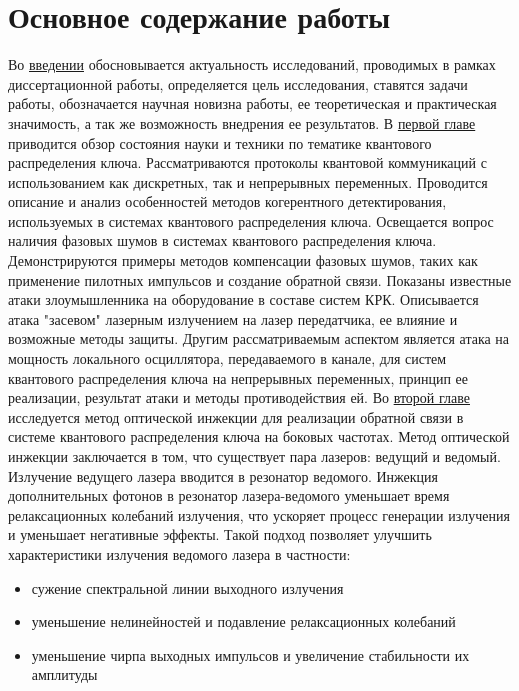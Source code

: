 \section*{Основное содержание работы }
Во \underline{введении} обосновывается актуальность исследований, проводимых в рамках диссертационной работы, определяется цель исследования, ставятся задачи работы, обозначается научная новизна работы, ее теоретическая и практическая значимость, а так же возможность внедрения ее результатов. 
\newline В \underline{первой главе} приводится обзор состояния науки и техники по тематике квантового распределения ключа. Рассматриваются протоколы квантовой коммуникаций с использованием как дискретных, так и непрерывных переменных. Проводится описание и анализ особенностей методов когерентного детектирования, используемых в системах квантового распределения ключа. Освещается вопрос наличия фазовых шумов в системах квантового распределения ключа. Демонстрируются примеры методов компенсации фазовых шумов, таких как применение пилотных импульсов и создание обратной связи.  Показаны известные атаки злоумышленника на оборудование в составе систем КРК. Описывается атака "засевом" лазерным излучением на лазер передатчика, ее влияние и возможные методы защиты. Другим рассматриваемым аспектом является атака на мощность локального осциллятора, передаваемого в канале, для систем квантового распределения ключа на непрерывных переменных, принцип ее реализации, результат атаки и методы противодействия ей.
\newline Во \underline{второй главе} исследуется метод оптической инжекции  для реализации обратной связи в системе квантового распределения ключа на боковых частотах. Метод оптической инжекции заключается в том, что существует пара лазеров: ведущий и ведомый. Излучение ведущего лазера вводится в резонатор ведомого. Инжекция дополнительных фотонов в резонатор лазера-ведомого уменьшает время релаксационных колебаний излучения, что ускоряет процесс генерации излучения и уменьшает негативные эффекты. Такой подход позволяет улучшить характеристики излучения ведомого лазера в частности:
\begin{itemize}
    \item сужение спектральной линии выходного излучения
    \item уменьшение нелинейностей и подавление релаксационных колебаний
    \item уменьшение чирпа выходных импульсов и увеличение стабильности их амплитуды
\end{itemize}
